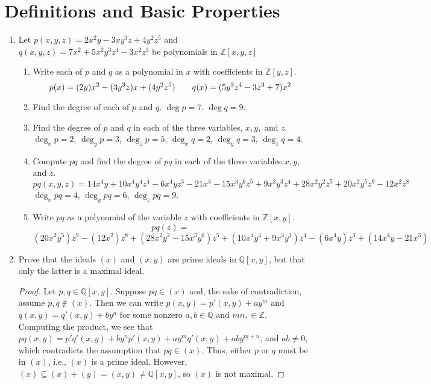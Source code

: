 \documentclass{report}
\newcommand{\Z}{\mathbb{Z}}
\newcommand{\Q}{\mathbb{Q}}
\begin{document}
\section{Definitions and Basic Properties}
\begin{enumerate}
	\item Let $p(x,y,z) = 2x^2y - 3xy^3z + 4y^2z^5$ and $q(x,y,z)=7x^2+5x^2y^3z^4-3x^2z^3$ be polynomials in $\Z[x,y,z]$
	\begin{enumerate}
		\item Write each of $p$ and $q$ as a polynomial in $x$ with coefficients in $\Z[y,z]$.
		$$ p(x) = (2y)x^2 - (3y^3z)x + (4y^2z^5) \hspace{20 pt} q(x) = (5y^3z^4-3z^3+7)x^2$$
		\item Find the degree of each of $p$ and $q$.
		$\deg p = 7$. $\deg q = 9$.
		\item Find the degree of $p$ and $q$ in each of the three variables, $x, y,$ and $z$.\newline
		$\deg_x p = 2$, $\deg_y p = 3$, $\deg_z p = 5$, $\deg_x q = 2$, $\deg_y q = 3$, $\deg_z q = 4$.
		\item Compute $pq$ and find the degree of $pq$ in each of the three variables $x,y,$ and $z$.
		$$pq(x,y,z) = 14x^4y + 10 x^4y^4z^4 - 6x^4yz^3 - 21x^3 -15x^3y^6z^5 + 9x^3y^3z^4 + 28x^2y^2z^5 + 20x^2y^5z^9 -12x^2z^8$$
		$\deg_x pq =4$, $\deg_y pq = 6$, $\deg_z pq = 9$.
		\item Write $pq$ as a polynomial of the variable $z$ with coefficients in $\Z[x,y]$.
		$$pq(z)=$$
		$$(20x^2y^5)z^9 - (12x^2)z^8 + (28x^2y^2-15x^3y^6)z^5 + (10x^4y^4 + 9x^3y^3)z^4 - (6x^4y)z^3 + (14x^4y-21x^3)$$
	\end{enumerate}
	
	\setcounter{enumi}{3}
	\item Prove that the ideals $(x)$ and $(x,y)$ are prime ideals in $\Q[x,y]$, but that only the latter is a maximal ideal.
	\begin{proof}
		Let $p,q\in \Q[x,y]$. Suppose $pq\in(x)$ and, the sake of contradiction, assume $p,q\notin (x)$.
		Then we can write $p(x,y)=p'(x,y)+ay^m$ and $q(x,y)=q'(x,y)+by^n$ for some nonzero $a,b\in \Q$ and $mn,\in \Z$.
		Computing the product, we see that $pq(x,y)=p'q'(x,y)+by^np'(x,y)+ay^mq'(x,y)+aby^{m+n}$, and $ab\neq 0$, which contradicts the assumption that $pq\in (x)$.
		Thus, either $p$ or $q$ must be in $(x)$, i.e., $(x)$ is a prime ideal. However, $(x)\subseteq (x)+(y)=(x,y)\neq \Q[x,y]$, so $(x)$ is not maximal.
		\bigskip


\end{proof}
\end{enumerate}
\end{document}
